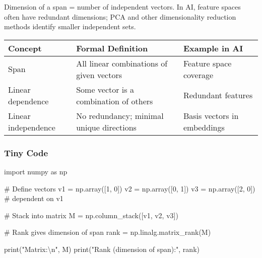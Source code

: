 \documentclass[
  letterpaper,
  DIV=11,
  numbers=noendperiod]{scrreprt}
\newenvironment{Shaded}{\begin{snugshade}}{\end{snugshade}}
\newcommand{\BuiltInTok}[1]{\textcolor[rgb]{0.00,0.23,0.31}{#1}}
\newcommand{\CharTok}[1]{\textcolor[rgb]{0.13,0.47,0.30}{#1}}
\newcommand{\CommentTok}[1]{\textcolor[rgb]{0.37,0.37,0.37}{#1}}
\newcommand{\DecValTok}[1]{\textcolor[rgb]{0.68,0.00,0.00}{#1}}
\newcommand{\ImportTok}[1]{\textcolor[rgb]{0.00,0.46,0.62}{#1}}
\newcommand{\NormalTok}[1]{\textcolor[rgb]{0.00,0.23,0.31}{#1}}
\newcommand{\OperatorTok}[1]{\textcolor[rgb]{0.37,0.37,0.37}{#1}}
\newcommand{\StringTok}[1]{\textcolor[rgb]{0.13,0.47,0.30}{#1}}
\begin{document}
Dimension of a span = number of independent vectors. In AI, feature
spaces often have redundant dimensions; PCA and other dimensionality
reduction methods identify smaller independent sets.

\begin{longtable}[]{@{}
  >{\raggedright\arraybackslash}p{}
  >{\raggedright\arraybackslash}p{}
  >{\raggedright\arraybackslash}p{}@{}}
\toprule\noalign{}
\begin{minipage}[b]{\linewidth}\raggedright
Concept
\end{minipage} & \begin{minipage}[b]{\linewidth}\raggedright
Formal Definition
\end{minipage} & \begin{minipage}[b]{\linewidth}\raggedright
Example in AI
\end{minipage} \\
\midrule\noalign{}
\endhead
\bottomrule\noalign{}
\endlastfoot
Span & All linear combinations of given vectors & Feature space
coverage \\
Linear dependence & Some vector is a combination of others & Redundant
features \\
Linear independence & No redundancy; minimal unique directions & Basis
vectors in embeddings \\
\end{longtable}

\subsubsection{Tiny Code}\label{tiny-code-103}

\begin{Shaded}
\begin{Highlighting}[]
\ImportTok{import}\NormalTok{ numpy }\ImportTok{as}\NormalTok{ np}

\CommentTok{\# Define vectors}
\NormalTok{v1 }\OperatorTok{=}\NormalTok{ np.array([}\DecValTok{1}\NormalTok{, }\DecValTok{0}\NormalTok{])}
\NormalTok{v2 }\OperatorTok{=}\NormalTok{ np.array([}\DecValTok{0}\NormalTok{, }\DecValTok{1}\NormalTok{])}
\NormalTok{v3 }\OperatorTok{=}\NormalTok{ np.array([}\DecValTok{2}\NormalTok{, }\DecValTok{0}\NormalTok{])  }\CommentTok{\# dependent on v1}

\CommentTok{\# Stack into matrix}
\NormalTok{M }\OperatorTok{=}\NormalTok{ np.column\_stack([v1, v2, v3])}

\CommentTok{\# Rank gives dimension of span}
\NormalTok{rank }\OperatorTok{=}\NormalTok{ np.linalg.matrix\_rank(M)}

\BuiltInTok{print}\NormalTok{(}\StringTok{"Matrix:}\CharTok{\textbackslash{}n}\StringTok{"}\NormalTok{, M)}
\BuiltInTok{print}\NormalTok{(}\StringTok{"Rank (dimension of span):"}\NormalTok{, rank)}
\end{Highlighting}
\end{Shaded}
\end{document}
